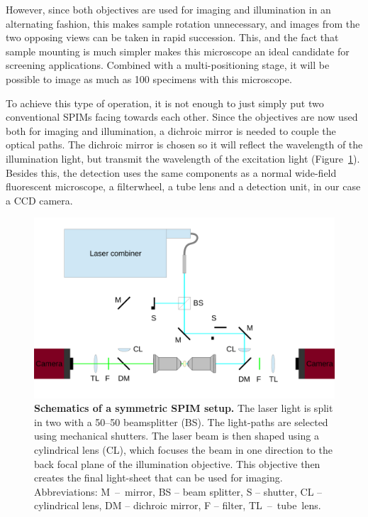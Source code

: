 \documentclass{diploma_style}
\begin{document}
However, since both objectives are used for imaging and illumination in an alternating fashion, this makes sample rotation unnecessary, and images from the two opposing views can be taken in rapid succession. This, and the fact that sample mounting is much simpler makes this microscope an ideal candidate for screening applications. Combined with a multi-positioning stage, it will be possible to image as much as 100 specimens with this microscope.

To achieve this type of operation, it is not enough to just simply put two conventional SPIMs facing towards each other. Since the objectives are now used both for imaging and illumination, a dichroic mirror is needed to couple the optical paths. The dichroic mirror is chosen so it will reflect the wavelength of the illumination light, but transmit the wavelength of the excitation light (Figure~\ref{fig:setup1}). Besides this, the detection uses the same components as a normal wide-field fluorescent microscope, a filterwheel, a tube lens and a detection unit, in our case a CCD camera.
\begin{figure}[htp]
	\centering
		\centering
		\includegraphics[width=\textwidth]{figures/2_spim/setup1free}
	\caption{\textbf{Schematics of a symmetric SPIM setup.} The laser light is split in two with a 50--50 beamsplitter (BS). The light-paths are selected using mechanical shutters. The laser beam is then shaped using a cylindrical lens (CL), which focuses the beam in one direction to the back focal plane of the illumination objective. This objective then creates the final light-sheet that can be used for imaging. Abbreviations: \mbox{M -- mirror}, BS -- beam splitter, S -- shutter, CL -- cylindrical lens, DM -- dichroic mirror, F -- filter, \mbox{TL -- tube lens}.}
	\label{fig:setup1}
\end{figure}
\end{document}
